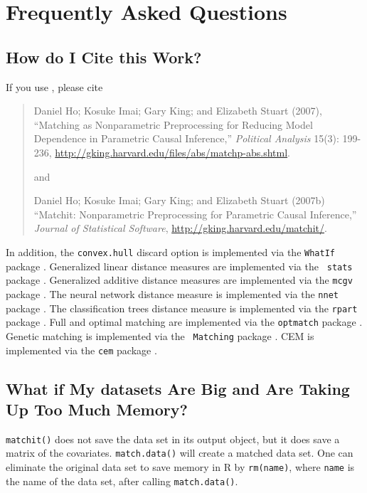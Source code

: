 \chapter{Frequently Asked Questions}

\section{How do I Cite this Work?}

If you use \MatchIt, please cite\nocite{HoImaKin07,HoImaKin07a}
\begin{verse}
  Daniel Ho; Kosuke Imai; Gary King; and Elizabeth Stuart (2007),
  ``Matching as Nonparametric Preprocessing for Reducing Model
  Dependence in Parametric Causal Inference,'' \emph{Political
    Analysis} 15(3): 199-236,
  \url{http://gking.harvard.edu/files/abs/matchp-abs.shtml}.

and 

Daniel Ho; Kosuke Imai; Gary King; and Elizabeth Stuart (2007b)
``Matchit: Nonparametric Preprocessing for Parametric Causal
Inference,'' \emph{Journal of Statistical Software},
\url{http://gking.harvard.edu/matchit/}.
\end{verse}

In addition, the {\tt convex.hull} discard option is implemented via
the {\tt WhatIf} package \citep{KinZen06,KinZen07,StoKinZen05}.
Generalized linear distance measures are implemented via the {\tt
  stats} package \citep{VenRip02}.  Generalized additive distance
measures are implemented via the {\tt mcgv} package \citep{HasTib90}.
The neural network distance measure is implemented via the {\tt nnet}
package \citep{Ripley96}.  The classification trees distance measure
is implemented via the {\tt rpart} package \citep{BreFriOls84}.  Full
and optimal matching are implemented via the {\tt optmatch} package
\citep{Hansen04}.  Genetic matching is implemented via the {\tt
  Matching} package \citep{DiaSek05}.  CEM is implemented via the
\texttt{cem} package \citep{IacKinPor08,IacKinPor08b}.

\section{What if My datasets Are Big and Are Taking Up
  Too Much Memory?}

{\tt matchit()} does not save the data set in its output object, but
it does save a matrix of the covariates.  {\tt match.data()} will
create a matched data set. One can eliminate the original data set to
save memory in R by {\tt rm(name)}, where {\tt name} is the name of
the data set, after calling {\tt match.data()}.

